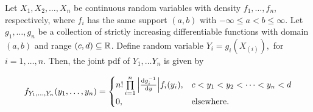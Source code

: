 \documentclass{report}
\begin{document}
\begin{thm} \label{thm: monoton transform of order stats}
    Let $X_1,X_2,\ldots, X_n$ be continuous random variables with density $f_1,\ldots, f_n$, respectively, where $f_i$ has the same support $(a,b)$ with $-\infty \leqslant a < b \leqslant \infty$. Let
    $g_1,\ldots,g_n$ be a collection of strictly increasing differentiable functions with domain $(a,b)$ and range $(c,d) \subseteq \mathbb{R}$.
     Define random variable $Y_i = g_i(X_{(i)}),$ for $i =1,\ldots,n$.
    Then, the joint pdf of $Y_1,\ldots Y_n$ is given by
    
    \[ 
        f_{Y_1,\ldots,Y_n}(y_1,\ldots, y_n) = \begin{cases}
            n!\prod\limits_{i=1}^{n} \abs{ \dv{g_i^{-1}}{y}}  f_i(y_i), & c < y_1 < y_2 <\cdots < y_n < d
            \\
            0, & \text{elsewhere.}
        \end{cases}
    \]
    \end{thm}
    
\end{document}
